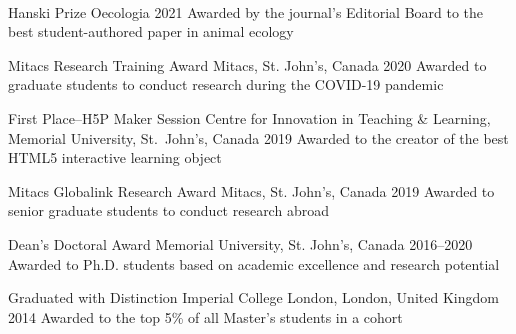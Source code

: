 \\


  \mycvhonor
    {Hanski Prize} %
    {Oecologia} %
    {2021} %
    {
    Awarded by the journal's Editorial Board to the best student-authored paper in animal ecology
    } %

  \mycvhonor
    {Mitacs Research Training Award} %
    {Mitacs, St. John's, Canada} %
    {2020} %
    {
    Awarded to graduate students to conduct research during the COVID-19 pandemic
    } %

  \mycvhonor
    {First Place--H5P Maker Session} %
    {\footnotesize Centre for Innovation in Teaching \& Learning, Memorial University, St.~John's, Canada} %
    {2019} %
    {
    Awarded to the creator of the best HTML5 interactive learning object 
    } %

  \mycvhonor
    {Mitacs Globalink Research Award} %
    {Mitacs, St. John's, Canada} %
    {2019} %
    {
     Awarded to senior graduate students to conduct research  abroad
    } %

  \mycvhonor
    {Dean's Doctoral Award} %
    {Memorial University, St. John's, Canada} %
    {2016--2020} %
    {
      Awarded to Ph.D. students based on academic excellence and research potential
    } %

  \mycvhonor
    {Graduated with Distinction} %
    {Imperial College London, London, United Kingdom} %
    {2014} %
    {
      Awarded to the top 5\% of all Master's students in a cohort
    } %

